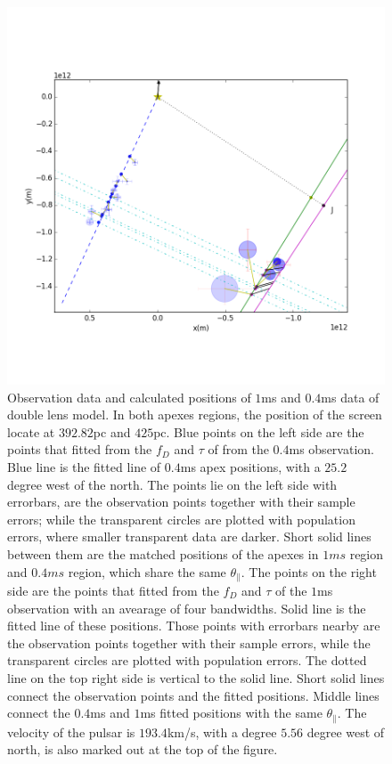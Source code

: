 \documentclass{emulateapj}
\begin{document}
\begin{figure}
\centering
\includegraphics[width=1.0\textwidth, angle=0]{Double_lens_xy.png}
\caption{Observation data and calculated positions of $1$ms and $0.4$ms data of double lens model. In both apexes regions, the position of the screen locate at $392.82$pc and $425$pc. Blue points on the left side are the points that fitted from the $f_D$ and $\tau$ of from the $0.4$ms observation. Blue line is the fitted line of $0.4$ms apex positions, with a $25.2$ degree west of the north. The points lie on the left side with errorbars, are the observation points together with their sample errors; while the transparent circles are plotted with population errors, where smaller transparent data are darker. Short solid lines between them are the matched positions of the apexes in $1ms$ region and $0.4ms$ region, which share the same $\theta_{\parallel}$. The points on the right side are the points that fitted from the $f_D$ and $\tau$ of the $1$ms observation with an avearage of four bandwidths. Solid line is the fitted line of these positions. Those points with errorbars nearby are the observation points together with their sample errors, while the transparent circles are plotted with population errors. The dotted line on the top right side is vertical to the solid line. Short solid lines connect the observation points and the fitted positions. Middle lines connect the $0.4$ms and $1$ms fitted positions with the same $\theta_{\parallel}$. The velocity of the pulsar is $193.4$km/s, with a degree $5.56$ degree west of north, is also marked out at the top of the figure.  }
\label{Doublelens}
\end{figure}
\end{document}
